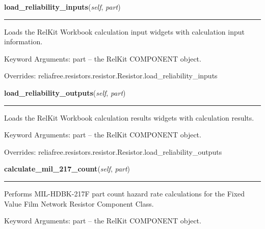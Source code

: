 \hspace{.8\funcindent}\begin{boxedminipage}{\funcwidth}

    \raggedright \textbf{load\_reliability\_inputs}(\textit{self}, \textit{part})

    \vspace{-1.5ex}

    \rule{\textwidth}{0.5\fboxrule}
\setlength{\parskip}{2ex}
    Loads the RelKit Workbook calculation input widgets with calculation
    input information.

    Keyword Arguments: part -- the RelKit COMPONENT object.

\setlength{\parskip}{1ex}
      Overrides: reliafree.resistors.resistor.Resistor.load\_reliability\_inputs

    \end{boxedminipage}

    \vspace{0.5ex}

\hspace{.8\funcindent}\begin{boxedminipage}{\funcwidth}

    \raggedright \textbf{load\_reliability\_outputs}(\textit{self}, \textit{part})

    \vspace{-1.5ex}

    \rule{\textwidth}{0.5\fboxrule}
\setlength{\parskip}{2ex}
    Loads the RelKit Workbook calculation results widgets with 
    calculation results.

    Keyword Arguments: part -- the RelKit COMPONENT object.

\setlength{\parskip}{1ex}
      Overrides: reliafree.resistors.resistor.Resistor.load\_reliability\_outputs

    \end{boxedminipage}

    \label{reliafree:resistors:fixed:FilmNetwork:calculate_mil_217_count}

    \vspace{0.5ex}

\hspace{.8\funcindent}\begin{boxedminipage}{\funcwidth}

    \raggedright \textbf{calculate\_mil\_217\_count}(\textit{self}, \textit{part})

    \vspace{-1.5ex}

    \rule{\textwidth}{0.5\fboxrule}
\setlength{\parskip}{2ex}
    Performs MIL-HDBK-217F part count hazard rate calculations for the 
    Fixed Value Film Network Resistor Component Class.

    Keyword Arguments: part -- the RelKit COMPONENT object.

\setlength{\parskip}{1ex}
    \end{boxedminipage}

